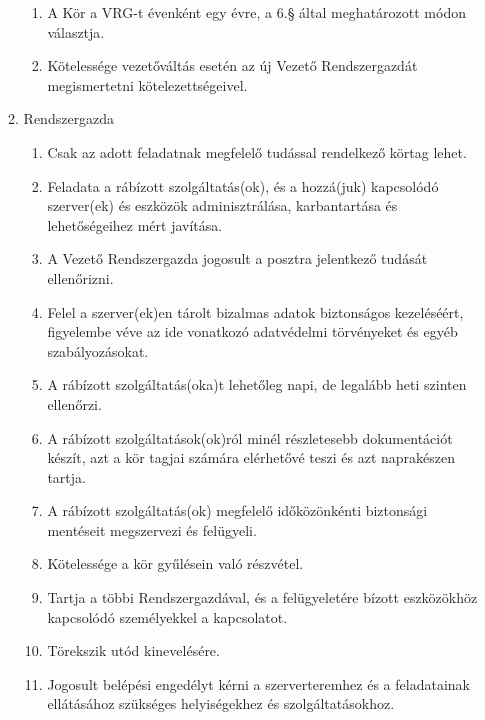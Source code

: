 \documentclass[12pt]{article}
\begin{document}
\begin{enumerate}
\begin{enumerate}
\begin{enumerate}
        \item A Kör a VRG-t évenként egy évre, a 6.§ által meghatározott módon választja.

        \item Kötelessége vezetőváltás esetén az új Vezető Rendszergazdát megismertetni kötelezettségeivel.
    \end{enumerate} %

  \item Rendszergazda
    \begin{enumerate}
      \item Csak az adott feladatnak megfelelő tudással rendelkező körtag lehet.

      \item Feladata a rábízott szolgáltatás(ok), és a hozzá(juk) kapcsolódó szerver(ek) és eszközök adminisztrálása, karbantartása és lehetőségeihez mért javítása.

      \item A Vezető Rendszergazda jogosult a posztra jelentkező tudását ellenőrizni.

      \item Felel a szerver(ek)en tárolt bizalmas adatok biztonságos kezeléséért,       figyelembe véve az ide vonatkozó adatvédelmi törvényeket és egyéb      szabályozásokat.

      \item A rábízott szolgáltatás(oka)t lehetőleg napi, de legalább heti szinten      ellenőrzi.

      \item A rábízott szolgáltatások(ok)ról minél részletesebb dokumentációt készít, azt a kör tagjai számára elérhetővé teszi és azt naprakészen tartja.

      \item A rábízott szolgáltatás(ok) megfelelő időközönkénti biztonsági mentéseit megszervezi és felügyeli.

      \item Kötelessége a kör gyűlésein való részvétel.

      \item Tartja a többi Rendszergazdával, és a felügyeletére bízott eszközökhöz      kapcsolódó személyekkel a kapcsolatot.

      \item Törekszik utód kinevelésére.

      \item Jogosult belépési engedélyt kérni a szerverteremhez és a feladatainak ellátásához szükséges helyiségekhez és szolgáltatásokhoz.


\end{enumerate}
\end{enumerate}
\end{enumerate}
\end{document}

